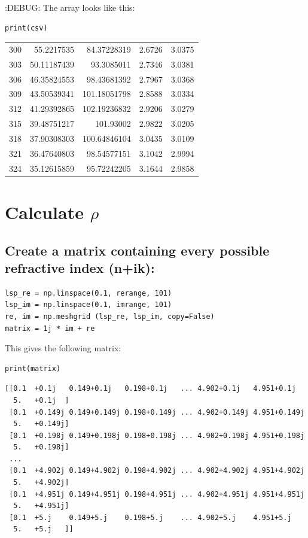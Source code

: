 \documentclass[11pt]{article}
\begin{document}
:DEBUG:
The array looks like this:
\begin{verbatim}
print(csv)
\end{verbatim}
\begin{center}
\begin{tabular}{rrrrr}
300 & 55.2217535 & 84.37228319 & 2.6726 & 3.0375\\
303 & 50.11187439 & 93.3085011 & 2.7346 & 3.0381\\
306 & 46.35824553 & 98.43681392 & 2.7967 & 3.0368\\
309 & 43.50539341 & 101.18051798 & 2.8588 & 3.0334\\
312 & 41.29392865 & 102.19236832 & 2.9206 & 3.0279\\
315 & 39.48751217 & 101.93002 & 2.9822 & 3.0205\\
318 & 37.90308303 & 100.64846104 & 3.0435 & 3.0109\\
321 & 36.47640803 & 98.54577151 & 3.1042 & 2.9994\\
324 & 35.12615859 & 95.72242205 & 3.1644 & 2.9858\\
\end{tabular}
\end{center}

\section{Calculate \(\rho\)}
\label{sec:org39c7fec}
\subsection{Create a matrix containing every possible refractive index (n+ik):}
\label{sec:orgaaa717f}
\begin{verbatim}
lsp_re = np.linspace(0.1, rerange, 101)
lsp_im = np.linspace(0.1, imrange, 101)
re, im = np.meshgrid (lsp_re, lsp_im, copy=False)
matrix = 1j * im + re
\end{verbatim}

This gives the following matrix:
\begin{verbatim}
print(matrix)
\end{verbatim}

\begin{verbatim}
[[0.1  +0.1j   0.149+0.1j   0.198+0.1j   ... 4.902+0.1j   4.951+0.1j
  5.   +0.1j  ]
 [0.1  +0.149j 0.149+0.149j 0.198+0.149j ... 4.902+0.149j 4.951+0.149j
  5.   +0.149j]
 [0.1  +0.198j 0.149+0.198j 0.198+0.198j ... 4.902+0.198j 4.951+0.198j
  5.   +0.198j]
 ...
 [0.1  +4.902j 0.149+4.902j 0.198+4.902j ... 4.902+4.902j 4.951+4.902j
  5.   +4.902j]
 [0.1  +4.951j 0.149+4.951j 0.198+4.951j ... 4.902+4.951j 4.951+4.951j
  5.   +4.951j]
 [0.1  +5.j    0.149+5.j    0.198+5.j    ... 4.902+5.j    4.951+5.j
  5.   +5.j   ]]
\end{verbatim}
\end{document}
